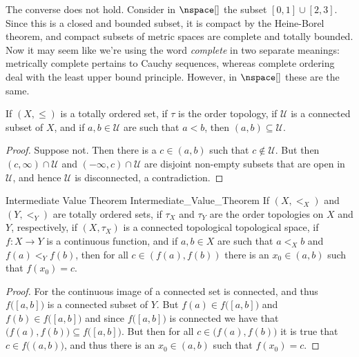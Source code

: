         The converse does not hold. Consider in $\nspace[]$ the subset
        $[0,1]\cup[2,3]$. Since this is a closed and bounded subset, it is
        compact by the Heine-Borel theorem, and compact subsets of metric spaces
        are complete and totally bounded. Now it may seem like we're using the
        word \textit{complete} in two separate meanings: metrically complete
        pertains to Cauchy sequences, whereas complete ordering deal with the
        least upper bound principle. However, in $\nspace[]$ these are the same.
        \begin{theorem}
                If $(X,\leq)$ is a totally ordered set, if $\tau$ is the order
                topology, if $\mathcal{U}$ is a connected subset of $X$, and if
                $a,b\in\mathcal{U}$ are such that $a<b$, then
                $(a,b)\subseteq\mathcal{U}$.
        \end{theorem}
        \begin{proof}
                Suppose not. Then there is a $c\in(a,b)$ such that
                $c\notin\mathcal{U}$. But then $(c,\infty)\cap\mathcal{U}$ and
                $(\minus\infty,c)\cap\mathcal{U}$ are disjoint non-empty subsets
                that are open in $\mathcal{U}$, and hence $\mathcal{U}$ is
                disconnected, a contradiction.
        \end{proof}
        \begin{ltheorem}{Intermediate Value Theorem}
                            {Intermediate_Value_Theorem}
                If $(X,<_{X})$ and $(Y,<_{Y})$ are totally ordered sets, if
                $\tau_{X}$ and $\tau_{Y}$ are the order topologies on $X$ and
                $Y$, respectively, if $(X,\tau_{X})$ is a connected topological
                topological space, if $f:X\rightarrow{Y}$ is a continuous
                function, and if $a,b\in{X}$ are such that $a<_{X}b$ and
                $f(a)<_{Y}f(b)$, then for all $c\in(f(a),f(b))$ there is an
                $x_{0}\in(a,b)$ such that $f(x_{0})=c$.
        \end{ltheorem}
        \begin{proof}
                For the continuous image of a connected set is connected, and
                thus $f\big([a,b]\big)$ is a connected subset of $Y$. But
                $f(a)\in{f}\big([a,b]\big)$ and $f(b)\in{f}\big([a,b]\big)$ and
                since $f\big([a,b]\big)$ is connected we have that
                $\big(f(a),f(b)\big)\subseteq{f}\big([a,b]\big)$. But then for
                all $c\in\big(f(a),f(b)\big)$ it is true that
                $c\in{f}\big((a,b)\big)$, and thus there is an $x_{0}\in(a,b)$
                such that $f(x_{0})=c$.
        \end{proof}

